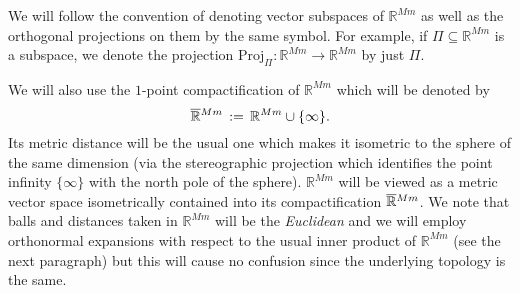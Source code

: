 \documentclass{amsart}
\theoremstyle{definition}
\numberwithin{equation}{section}
\begin{document}
We will follow the convention of denoting vector subspaces of ${\mathbb{R}}^{Mm}$ as well as the orthogonal projections on them by the same symbol. For example, if $\Pi {\subseteq} {\mathbb{R}}^{Mm}$ is a subspace, we denote the projection $\text{Proj}_\Pi : {\mathbb{R}}^{Mm} {\longrightarrow} {\mathbb{R}}^{Mm}$ by just $\Pi$.  

We will also use the $1$-point compactification of ${\mathbb{R}}^{Mm}$ which will be denoted by 
\[
\smash{\overline{\mathbb{R}}}^{Mm} \, :=\, {\mathbb{R}}^{Mm} \cup \{\infty\}.
\]
Its metric distance will be the usual one which makes it isometric to the sphere of the same dimension (via the stereographic projection which identifies the point infinity $\{\infty\}$ with the north pole of the sphere). ${\mathbb{R}}^{Mm}$ will be viewed as a metric vector space isometrically contained into its compactification $\smash{\overline{\mathbb{R}}}^{Mm}$. We note that balls and distances taken in ${\mathbb{R}}^{Mm}$ will be the \emph{Euclidean} and we will employ orthonormal expansions with respect to the usual inner product of ${\mathbb{R}}^{Mm}$ (see the next paragraph) but this will cause no confusion since the underlying topology is the same.

{\medskip}
\end{document}
